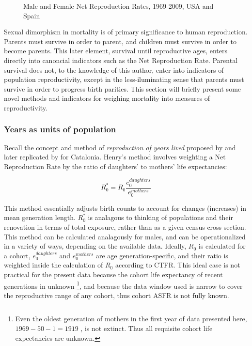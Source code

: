 \begin{figure}[ht!]
        \centering  
          \caption{Male and Female Net Reproduction Rates, 1969-2009, USA and
          Spain}
          \label{fig:NRRseries}
\end{figure}




Sexual dimorphism in mortality is of primary significance to human reproduction.
Parents must survive in order to parent, and children must survive in order to
become parents. This later element, survival until reproductive ages, enters
directly into canoncial indicators such as the Net Reproduction Rate. Parental
survival does not, to the knowledge of this author, enter into indicators of
population reproductivity, except in the less-iluminating sense that parents
must survive in order to progress birth parities. This section will briefly present 
some novel methods and indicators for weighing mortality into measures of
reproductivity.


\subsubsection{Years as units of population}
Recall the concept and method of \textit{reproduction of years lived} proposed
by \citet{henry1965reflexions} and later replicated by \citet{cabre1990repro}
for Catalonia. Henry's method involves weighting a Net Reproduction Rate by
the ratio of daughters' to mothers' life expectancies:

\begin{equation}
R_{0}^{\ast} = R_{0} \frac{e_0^{daughters}}{e_0^{mothers}}
\end{equation}

This method essentially adjusts birth counts to account for changes (increases)
in mean generation length. $R_{0}^{\ast}$ is analagous to thinking of populations 
and their renovation in terms of total exposure, rather than as a given census cross-section. This
method can be calculated analagously for males, and can be operationalized 
in a variety of ways, depending on the available data. Ideally, 
$R_{0}$ is calculated for a cohort, $e_0^{daughters}$ and $e_0^{mothers}$ are
age generation-specific, and their ratio is weighted inside the calculation of
$R_0$ according to CTFR. This ideal case is not practical for the present
data because the cohort life expectancy of recent generations in unknown
\footnote{Even the oldest generation of mothers in the first year of data
presented here, $1969-50-1 = 1919$ , is not extinct. Thus all requisite cohort
life expectancies are unknown.}, and because the data window used is narrow to
cover the reproductive range of any cohort, thus cohort ASFR is not fully known.

